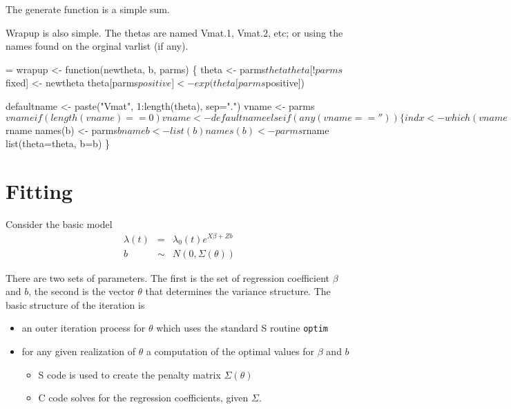 \documentclass{article}
\begin{document}
The generate function is a simple sum.
Wrapup is also simple. The thetas are named Vmat.1, Vmat.2, etc; or using
the names found on the orginal varlist (if any).
\begin{nwchunk}
=
 wrapup <- function(newtheta, b, parms) \{
         theta <- parms$theta
         theta[!parms$fixed] <- newtheta
         theta[parms$positive] <- exp(theta[parms$positive])
 
         defaultname <- paste("Vmat", 1:length(theta), sep=".")
         vname <- parms$vname
         if (length(vname)==0) vname <- defaultname
         else if (any(vname==''))\{
             indx <- which(vname=='')
             vname[indx] <- defaultname[indx]
             \}
         names(theta) <- vname
         theta <- list(theta)
         names(theta) <- parms$rname
         names(b) <- parms$bname
         b <- list(b)
         names(b) <- parms$rname
         list(theta=theta, b=b)
         \}
\end{nwchunk}
\section{Fitting}
Consider the basic model
\begin{eqnarray*}
 \lambda(t) &=& \lambda_0(t) e^{X\beta + Zb} \\
 b &\sim& N(0, \Sigma(\theta))
\end{eqnarray*}

There are two sets of parameters.
The first is the set of regression coefficient $\beta$ and $b$,
the second is the vector $\theta$ that determines the variance
structure.
The basic structure of the iteration is
\begin{itemize}
\item an outer iteration process for $\theta$ which uses the standard
S routine \Verb!optim!
\item for any given realization of $\theta$ a computation of the optimal
values for $\beta$ and $b$
\begin{itemize}
\item S code is used to create the penalty matrix $\Sigma(\theta)$
\item C code solves for the regression coefficients, given $\Sigma$.
\end{itemize}
\end{itemize}
\end{document}
